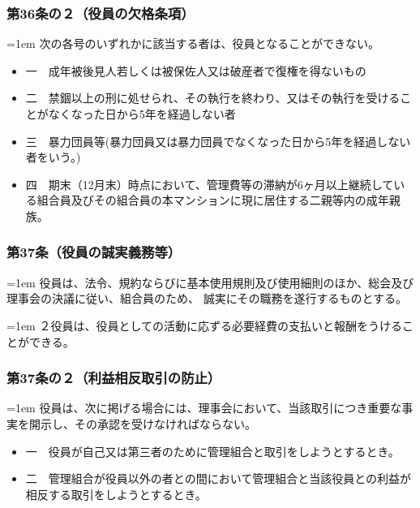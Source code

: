 \documentclass[
  twoside,
  luatex,
  paper=a4paper,
  fontsize=11pt,
  jafontsize=11pt,
  jlreq_notes,
]{jlreq}
\newcommand{\joumain}[1]{%
  \noindent\hangindent=1em\hangafter=1
  \hspace{1em}#1%
}
\newcommand{\kou}[2]{%
  \par\noindent\hangindent=1em\hangafter=1
  #1\hspace{1em}#2%
}
\begin{document}
  \subsubsection*{第36条の２（役員の欠格条項）}
  \joumain{次の各号のいずれかに該当する者は、役員となることができない。}
  \begin{itemize}[label={}, leftmargin=3em, itemindent=-2em]
    \item 一　成年被後見人若しくは被保佐人又は破産者で復権を得ないもの
    \item 二　禁錮以上の刑に処せられ、その執行を終わり、又はその執行を受けることがなくなった日から5年を経過しない者
    \item 三　暴力団員等(暴力団員又は暴力団員でなくなった日から5年を経過しない者をいう。)
    \item 四　期末（12月末）時点において、管理費等の滞納が6ヶ月以上継続している組合員及びその組合員の本マンションに現に居住する二親等内の成年親族。
  \end{itemize}

  \subsubsection*{第37条（役員の誠実義務等）}
  \joumain{役員は、法令、規約ならびに基本使用規則及び使用細則のほか、総会及び理事会の決議に従い、組合員のため、
  誠実にその職務を遂行するものとする。}
  \kou{２}{役員は、役員としての活動に応ずる必要経費の支払いと報酬をうけることができる。}

  \subsubsection*{第37条の２（利益相反取引の防止）}
  \joumain{役員は、次に掲げる場合には、理事会において、当該取引につき重要な事実を開示し、その承認を受けなければならない。}
  \begin{itemize}[label={}, leftmargin=3em, itemindent=-2em]
    \item 一　役員が自己又は第三者のために管理組合と取引をしようとするとき。
    \item 二　管理組合が役員以外の者との間において管理組合と当該役員との利益が相反する取引をしようとするとき。
  \end{itemize}
\end{document}
